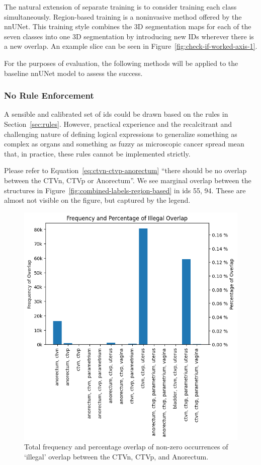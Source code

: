 \documentclass[11pt,twoside]{report}
\begin{document}
The natural extension of separate training is to consider training each class simultaneously. Region-based training is a noninvasive method offered by the nnUNet. This training style combines the 3D segmentation maps for each of the seven classes into one 3D segmentation by introducing new IDs wherever there is a new overlap. An example slice can be seen in Figure~\ref{fig:check-if-worked-axis-1}.

For the purposes of evaluation, the following methods will be applied to the baseline nnUNet model to assess the success.


\subsubsection{No Rule Enforcement}

A sensible and calibrated set of ids could be drawn based on the rules in Section~\ref{sec:rules}. However, practical experience and the recalcitrant and challenging nature of defining logical expressions to generalize something as complex as organs and something as fuzzy as microscopic cancer spread mean that, in practice, these rules cannot be implemented strictly.


Please refer to Equation~\ref{eq:ctvn-ctvp-anorectum} ``there should be no overlap between the CTVn, CTVp or Anorectum''. We see marginal overlap between the structures in Figure~\ref{fig:combined-labels-region-based} in ids 55, 94. These are almost not visible on the figure, but captured by the legend. 

\begin{figure}[H]
  \centering
  \includegraphics[height=.4\textheight]{../figures/percentage_of_illegal_overlap.png}
  \caption{Total frequency and percentage overlap of non-zero occurrences of `illegal' overlap between the CTVn, CTVp, and Anorectum.}\label{fig:illegal_overlap}
\end{figure}
\end{document}
